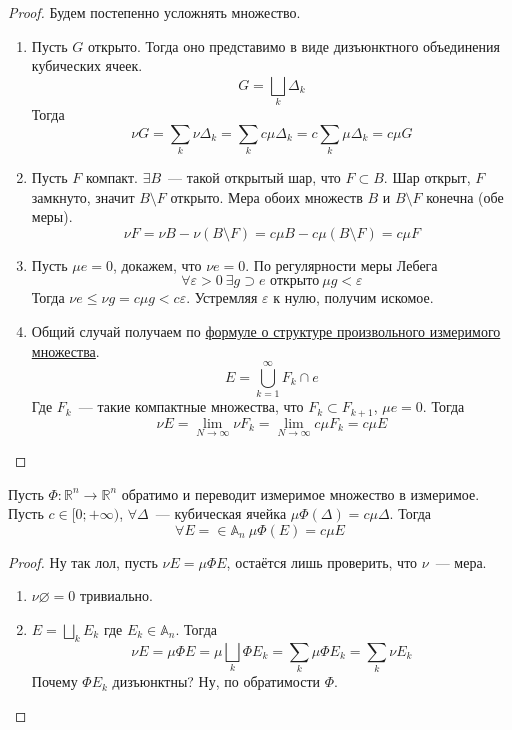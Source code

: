 \documentclass{article}
\let\eps\varepsilon
\begin{document}
    \begin{proof}
        Будем постепенно усложнять множество.
        \begin{enumerate}
            \item Пусть $G$ открыто. Тогда оно представимо в виде дизъюнктного объединения кубических ячеек.
            $$
            G=\bigsqcup\limits_k\Delta_k
            $$
            Тогда
            $$
            \nu G=\sum\limits_k\nu\Delta_k=\sum\limits_kc\mu\Delta_k=c\sum\limits_k\mu\Delta_k=c\mu G
            $$
            \item Пусть $F$ компакт. $\exists B$~--- такой открытый шар, что $F\subset B$. Шар открыт, $F$ замкнуто, значит $B\setminus F$ открыто. Мера обоих множеств $B$ и $B\setminus F$ конечна (обе меры).
            $$
            \nu F=\nu B-\nu(B\setminus F)=c\mu B-c\mu(B\setminus F)=c\mu F
            $$
            \item Пусть $\mu e=0$, докажем, что $\nu e=0$. По регулярности меры Лебега
            $$
            \forall\eps>0~\exists g\supset e\text{ открыто}~\mu g<\eps
            $$
            Тогда $\nu e\leqslant\nu g=c\mu g<c\eps$. Устремляя $\eps$ к нулю, получим искомое.
            \item Общий случай получаем по \hyperref[Структура произвольного измеримого множества]{формуле о структуре произвольного измеримого множества}.
            $$
            E=\bigcup\limits_{k=1}^\infty F_k\cap e
            $$
            Где $F_k$~--- такие компактные множества, что $F_k\subset F_{k+1}$, $\mu e=0$. Тогда
            $$
            \nu E=\lim\limits_{N\to\infty}\nu F_k=\lim\limits_{N\to\infty}c\mu F_k=c\mu E
            $$
        \end{enumerate}
    \end{proof}
    \begin{corollary}
        Пусть $\Phi\colon\mathbb R^n\to\mathbb R^n$ обратимо и переводит измеримое множество в измеримое. Пусть $c\in[0;+\infty)$, $\forall\Delta$~--- кубическая ячейка $\mu\Phi(\Delta)=c\mu\Delta$. Тогда
        $$
        \forall E=\in\mathbb A_n~\mu\Phi(E)=c\mu E
        $$
    \end{corollary}
    \begin{proof}
        Ну так лол, пусть $\nu E=\mu\Phi E$, остаётся лишь проверить, что $\nu$~--- мера.
        \begin{enumerate}
            \item $\nu\varnothing=0$ тривиально.
            \item $E=\bigsqcup\limits_k E_k$ где $E_k\in\mathbb A_n$. Тогда
            $$
            \nu E=\mu\Phi E=\mu\bigsqcup\limits_k\Phi E_k=\sum\limits_k\mu\Phi E_k=\sum\limits_k\nu E_k
            $$
            Почему $\Phi E_k$ дизъюнктны? Ну, по обратимости $\Phi$.
        \end{enumerate}
    \end{proof}
\end{document}
